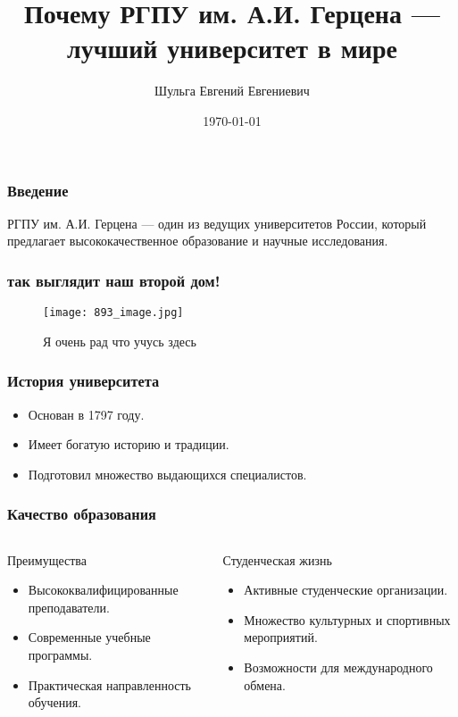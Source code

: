\documentclass{beamer}
\title{Почему РГПУ им. А.И. Герцена — лучший университет в мире}
\author{Шульга Евгений Евгениевич}
\date{\today}
\begin{document}
\frame{\titlepage}

\begin{frame}
\frametitle{Введение}
РГПУ им. А.И. Герцена — один из ведущих университетов России, который предлагает высококачественное образование и научные исследования.
\end{frame}

\begin{frame}
\frametitle{так выглядит наш второй дом!}
\begin{figure}
    \centering
    \texttt{[image: 893\_image.jpg]} 
    \caption{Я очень рад что учусь здесь}
\end{figure}
\end{frame}

\begin{frame}
\frametitle{История университета}
\begin{itemize}
    \item Основан в 1797 году.
    \item Имеет богатую историю и традиции.
    \item Подготовил множество выдающихся специалистов.
\end{itemize}
\end{frame}

\begin{frame}
\frametitle{Качество образования}
\begin{columns}
\begin{block}{Преимущества}
\begin{itemize}
    \item Высококвалифицированные преподаватели.
    \item Современные учебные программы.
    \item Практическая направленность обучения.
\end{itemize}
\end{block}
\begin{block}{Студенческая жизнь}
\begin{itemize}
    \item Активные студенческие организации.
    \item Множество культурных и спортивных мероприятий.
    \item Возможности для международного обмена.
\end{itemize}
\end{block}
\end{columns}
\end{frame}
\end{document}
